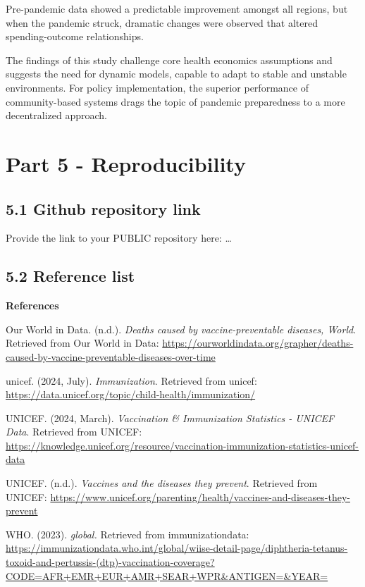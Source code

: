 \documentclass[
]{article}
\begin{document}
Pre-pandemic data showed a predictable improvement amongst all regions,
but when the pandemic struck, dramatic changes were observed that
altered spending-outcome relationships.

The findings of this study challenge core health economics assumptions
and suggests the need for dynamic models, capable to adapt to stable and
unstable environments. For policy implementation, the superior
performance of community-based systems drags the topic of pandemic
preparedness to a more decentralized approach.

\section{Part 5 - Reproducibility}\label{part-5---reproducibility}

\subsection{5.1 Github repository link}\label{github-repository-link}

Provide the link to your PUBLIC repository here: \ldots{}

\subsection{5.2 Reference list}\label{reference-list}

\textbf{References}

Our World in Data. (n.d.). \emph{Deaths caused by vaccine-preventable
diseases, World}. Retrieved from Our World in Data:
\url{https://ourworldindata.org/grapher/deaths-caused-by-vaccine-preventable-diseases-over-time}

unicef. (2024, July). \emph{Immunization}. Retrieved from unicef:
\url{https://data.unicef.org/topic/child-health/immunization/}

UNICEF. (2024, March). \emph{Vaccination \& Immunization Statistics -
UNICEF Data}. Retrieved from UNICEF:
\url{https://knowledge.unicef.org/resource/vaccination-immunization-statistics-unicef-data}

UNICEF. (n.d.). \emph{Vaccines and the diseases they prevent}. Retrieved
from UNICEF:
\url{https://www.unicef.org/parenting/health/vaccines-and-diseases-they-prevent}

WHO. (2023). \emph{global.} Retrieved from immunizationdata:
\url{https://immunizationdata.who.int/global/wiise-detail-page/diphtheria-tetanus-toxoid-and-pertussis-(dtp)-vaccination-coverage?CODE=AFR+EMR+EUR+AMR+SEAR+WPR&ANTIGEN=&YEAR=}
\end{document}
